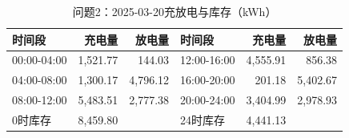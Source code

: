 \begin{table}[H]\centering\small\caption{问题2：2025-03-20充放电与库存（kWh）}\label{tab:q220250320b}
\begin{tabular}{lrrlrr}\toprule
时间段 & 充电量 & 放电量 & 时间段 & 充电量 & 放电量\\\midrule
00:00-04:00 & 1,521.77 & 144.03 & 12:00-16:00 & 4,555.91 & 856.38\\
04:00-08:00 & 1,300.17 & 4,796.12 & 16:00-20:00 & 201.18 & 5,402.67\\
08:00-12:00 & 5,483.51 & 2,777.38 & 20:00-24:00 & 3,404.99 & 2,978.93\\
0时库存 & 8,459.80 &  & 24时库存 & 4,441.13 & \\
\bottomrule\end{tabular}\end{table}
